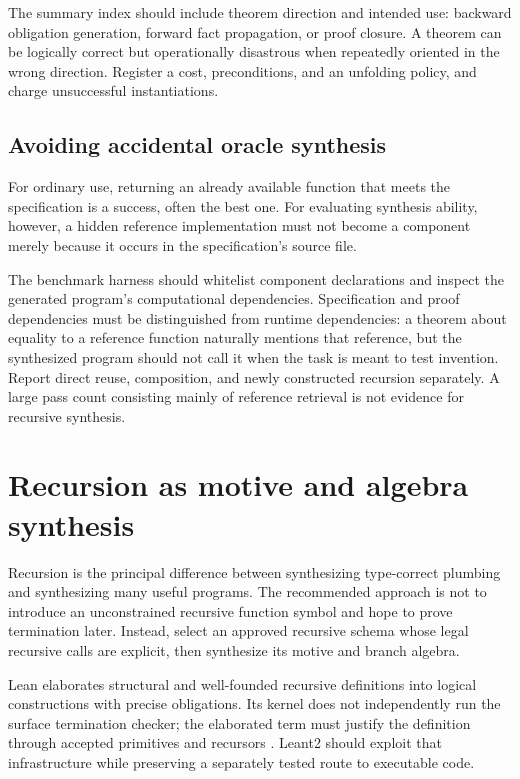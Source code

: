 \documentclass[11pt,letterpaper]{article}
\theoremstyle{definition}
\theoremstyle{remark}
\begin{document}
The summary index should include theorem direction and intended use: backward obligation generation, forward fact propagation, or proof closure. A theorem can be logically correct but operationally disastrous when repeatedly oriented in the wrong direction. Register a cost, preconditions, and an unfolding policy, and charge unsuccessful instantiations.

\subsection{Avoiding accidental oracle synthesis}

For ordinary use, returning an already available function that meets the specification is a success, often the best one. For evaluating synthesis ability, however, a hidden reference implementation must not become a component merely because it occurs in the specification's source file.

The benchmark harness should whitelist component declarations and inspect the generated program's computational dependencies. Specification and proof dependencies must be distinguished from runtime dependencies: a theorem about equality to a reference function naturally mentions that reference, but the synthesized program should not call it when the task is meant to test invention. Report direct reuse, composition, and newly constructed recursion separately. A large pass count consisting mainly of reference retrieval is not evidence for recursive synthesis.

\section{Recursion as motive and algebra synthesis}
\label{sec:recursion}

Recursion is the principal difference between synthesizing type-correct plumbing and synthesizing many useful programs. The recommended approach is not to introduce an unconstrained recursive function symbol and hope to prove termination later. Instead, select an approved recursive schema whose legal recursive calls are explicit, then synthesize its motive and branch algebra.

Lean elaborates structural and well-founded recursive definitions into logical constructions with precise obligations. Its kernel does not independently run the surface termination checker; the elaborated term must justify the definition through accepted primitives and recursors \cite{leanrec}. Leant2 should exploit that infrastructure while preserving a separately tested route to executable code.
\end{document}
